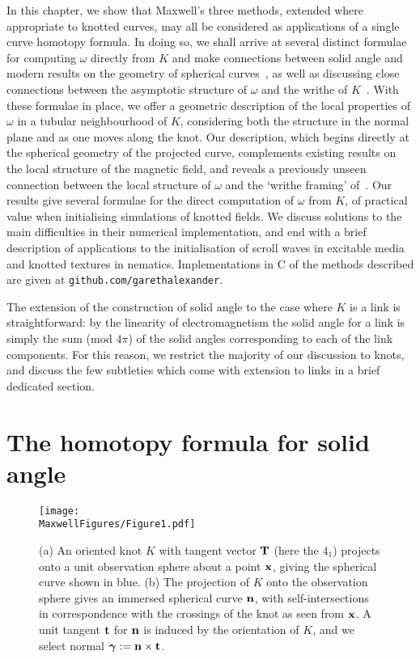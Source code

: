     In this chapter, we show that Maxwell's three methods, extended where appropriate to knotted curves, may all be considered as applications of a single curve homotopy formula. In doing so, we shall arrive at several distinct formulae for computing $\omega$ directly from $K$ and make connections between solid angle and modern results on the geometry of spherical curves~\citep{Levi1994,Arnold1995}, as well as discussing close connections between the asymptotic structure of $\omega$ and the writhe of $K$~\citep{Fuller1978,Dennis2005}. With these formulae in place, we offer a geometric description of the local properties of $\omega$ in a tubular neighbourhood of $K$, considering both the structure in the normal plane and as one moves along the knot. Our description, which begins directly at the spherical geometry of the projected curve, complements existing results on the local structure of the magnetic field, and reveals a previously unseen connection between the local structure of $\omega$ and the `writhe framing' of~\citep{Dennis2005}. 
    Our results give several formulae for the direct computation of $\omega$ from $K$, of practical value when initialising simulations of knotted fields. We discuss solutions to the main difficulties in their numerical implementation, and end with a brief description of applications to the initialisation of scroll waves in excitable media and knotted textures in nematics. Implementations in C of the methods described are given at \verb=github.com/garethalexander=.

    The extension of the construction of solid angle to the case where $K$ is a link is straightforward: by the linearity of electromagnetism the solid angle for a link is simply the sum (mod $4\pi$) of the solid angles corresponding to each of the link components. For this reason, we restrict the majority of our discussion to knots, and discuss the few subtleties which come with extension to links in a brief dedicated section.

    \section{The homotopy formula for solid angle} 
    \label{sec:CurveIsotopies}

    \begin{figure}[t]
        \centering	
        \texttt{[image: \\MaxwellFigures/Figure1.pdf]}
        \caption[Spherical knot projection onto an observation point.]{(a) An oriented knot $K$ with tangent vector $\bf T$ (here the $4_1$) projects onto a unit observation sphere about a point $\bf x$, giving the spherical curve shown in blue. (b) The projection of $K$ onto the observation sphere gives an immersed spherical curve $\bf n$, with self-intersections in correspondence with the crossings of the knot as seen from $\bf x$. A unit tangent $\bf t$ for $\bf n$ is induced by the orientation of $K$, and we select normal $\boldsymbol{\gamma} := \bf n \times \bf t$.}
        \label{fig:Knot} 
    \end{figure}

